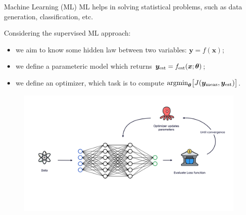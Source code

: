 \documentclass[8pt, xcolor={svgnames}, hyperref={linkcolor=black}]{beamer}
\begin{document}
\begin{frame}{Machine Learning (ML)}
\vspace{0.5cm}
ML helps in solving statistical problems, such as data generation, 
classification, etc.
\pause

Considering the supervised ML approach:
\pause
\begin{itemize}
\item[\faCrosshairs] we aim to know some hidden law between two variables: $\bm{y}=f(\bm{x})$;
\pause
\item[\faBarChart] we define a parameteric model which returns $\bm{y}_{\rm est}=f_{\rm est}(\bm{x}; \bm{\theta})$;
\pause
\item[\faBinoculars] we define an optimizer, which task is to compute 
   $\text{argmin}_{\bm{\theta}}\bigl[J(\bm{y}_{\rm meas}, \bm{y}_{\rm est})\bigr]$.
\end{itemize}
\pause
\vspace{-0.4cm}
\begin{figure}  
    \includegraphics[width=1\textwidth]{figures/ml_scheme.png}
\end{figure}
\end{frame}
\end{document}
